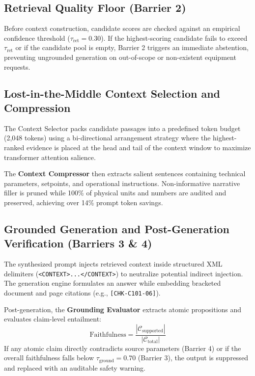 \subsection{Retrieval Quality Floor (Barrier 2)}
Before context construction, candidate scores are checked against an empirical confidence threshold ($\tau_{\text{ret}} = 0.30$). If the highest-scoring candidate fails to exceed $\tau_{\text{ret}}$ or if the candidate pool is empty, Barrier 2 triggers an immediate abstention, preventing ungrounded generation on out-of-scope or non-existent equipment requests.

\subsection{Lost-in-the-Middle Context Selection and Compression}
The Context Selector packs candidate passages into a predefined token budget (2,048 tokens) using a bi-directional arrangement strategy where the highest-ranked evidence is placed at the head and tail of the context window to maximize transformer attention salience.

The \textbf{Context Compressor} then extracts salient sentences containing technical parameters, setpoints, and operational instructions. Non-informative narrative filler is pruned while 100\% of physical units and numbers are audited and preserved, achieving over 14\% prompt token savings.

\subsection{Grounded Generation and Post-Generation Verification (Barriers 3 \& 4)}
The synthesized prompt injects retrieved context inside structured XML delimiters (\texttt{<CONTEXT>...</CONTEXT>}) to neutralize potential indirect injection. The generation engine formulates an answer while embedding bracketed document and page citations (e.g., \texttt{[CHK-C101-06]}).

Post-generation, the \textbf{Grounding Evaluator} extracts atomic propositions and evaluates claim-level entailment:
\begin{equation}
\text{Faithfulness} = \frac{|\mathcal{C}_{\text{supported}}|}{|\mathcal{C}_{\text{total}}|}
\end{equation}
If any atomic claim directly contradicts source parameters (Barrier 4) or if the overall faithfulness falls below $\tau_{\text{ground}} = 0.70$ (Barrier 3), the output is suppressed and replaced with an auditable safety warning.
